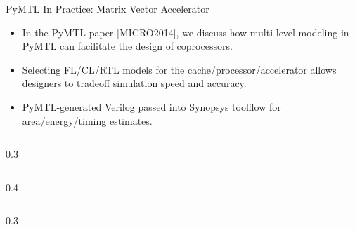 \begin{frame}{PyMTL In Practice: Matrix Vector Accelerator}

\begin{itemize}
  \item In the PyMTL paper [MICRO2014], we discuss how multi-level modeling
        in PyMTL can facilitate the design of coprocessors.
  \item Selecting FL/CL/RTL models for the cache/processor/accelerator
        allows designers to tradeoff simulation speed and accuracy.
  \item PyMTL-generated Verilog passed into Synopsys toolflow for
        area/energy/timing estimates.
\end{itemize}

  \vspace{.2in}

  \begin{cbxcols}
  \begin{column}{0.3\tw}
  \end{column}

  \begin{column}{0.4\tw}
  \end{column}

  \begin{column}{0.3\tw}
  \end{column}
  \end{cbxcols}

\end{frame}



